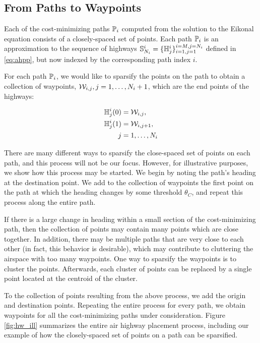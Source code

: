 \subsection{From Paths to Waypoints}
Each of the cost-minimizing paths $\mathbb{P}_i$ computed from the solution to the Eikonal equation consists of a closely-spaced set of points. Each path $\mathbb{P}_i$ is an approximation to the sequence of highways $\mathbb{S}_{N_i}^i = \{\mathbb{H}^i_j\}_{i=1,j=1}^{i=M,j=N_i}$ defined in \eqref{eq:ahpp}, but now indexed by the corresponding path index $i$. 

For each path $\mathbb{P}_i$, we would like to sparsify the points on the path to obtain a collection of waypoints, $\mathcal{W}_{i,j}, j = 1,\ldots, N_i+1$, which are the end points of the highways:

\begin{equation}
\begin{aligned}
\mathbb{H}^i_j(0) &= \mathcal{W}_{i,j}, \\
\mathbb{H}^i_j(1) &= \mathcal{W}_{i,j+1}, \\
j &= 1,\ldots,N_i
\end{aligned}
\end{equation}

There are many different ways to sparsify the close-spaced set of points on each path, and this process will not be our focus. However, for illustrative purposes, we show how this process may be started. We begin by noting the path's heading at the destination point. We add to the collection of waypoints the first point on the path at which the heading changes by some threshold $\theta_C$, and repeat this process along the entire path.

If there is a large change in heading within a small section of the cost-minimizing path, then the collection of points may contain many points which are close together. In addition, there may be multiple paths that are very close to each other (in fact, this behavior is desirable), which may contribute to cluttering the airspace with too many waypoints. One way to sparsify the waypoints is to cluster the points. Afterwards, each cluster of points can be replaced by a single point located at the centroid of the cluster. 

To the collection of points resulting from the above process, we add the origin and destination points. Repeating the entire process for every path, we obtain waypoints for all the cost-minimizing paths under consideration. Figure \ref{fig:hw_ill} summarizes the entire air highway placement process, including our example of how the closely-spaced set of points on a path can be sparsified.